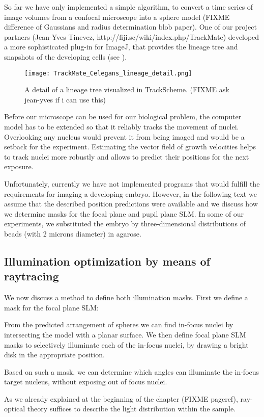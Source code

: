 So far we have only implemented a simple algorithm, to convert a time
series of image volumes from a confocal microscope into a sphere model
(FIXME difference of Gaussians and radius determination blob paper).
One of our project partners (Jean-Yves Tinevez,
http://fiji.sc/wiki/index.php/TrackMate) developed a more
sophisticated plug-in for ImageJ, that provides the lineage tree and
snapshots of the developing cells (see ).
\begin{figure}[!hbt]
  \centering
  \texttt{[image: TrackMate\_Celegans\_lineage\_detail.png]}
  \caption{ A detail of a lineage tree visualized in
    TrackScheme. (FIXME ask jean-yves if i can use this)}
  \label{fig:trackmate}
\end{figure}
Before our microscope can be used for our biological problem, the
computer model has to be extended so that it reliably tracks the
movement of nuclei.  Overlooking any nucleus would prevent it from being 
imaged and would be a setback for the experiment.  Estimating the
vector field of growth velocities helps to track nuclei more robustly
and allows to predict their positions for the next exposure.


Unfortunately, currently we have not implemented programs that would
fulfill the requirements for imaging a developing embryo.  However, in
the following text we assume that the described position predictions
were available and we discuss how we determine masks for the focal
plane and pupil plane SLM.  In some of our experiments, we substituted
the embryo by three-dimensional distributions of beads (with 2 microns
diameter) in agarose.

\subsection{Illumination optimization by means of raytracing}
We now discuss a method to define both illumination masks. First we
define a mask for the focal plane SLM:

From the predicted arrangement of spheres we can find in-focus nuclei
by intersecting the model with a planar surface. We then define focal
plane SLM masks to selectively illuminate each of the in-focus nuclei,
by drawing a bright disk in the appropriate position.

Based on such a mask, we can determine which angles can illuminate the
in-focus target nucleus, without exposing out of focus nuclei.

As we already explained at the beginning of the chapter (FIXME
pageref), ray-optical theory suffices to describe the light
distribution within the sample.

